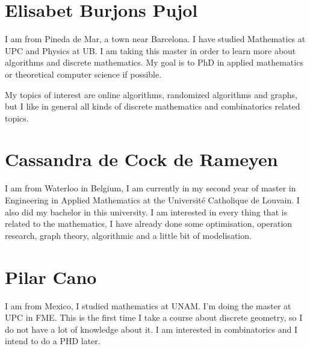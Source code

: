\documentclass[11pt]{amsart}
\begin{document}
\section*{Elisabet Burjons Pujol}

I am from Pineda de Mar, a town near Barcelona. I have studied Mathematics at UPC and Physics at UB. 
I am taking this master in order to learn more about algorithms and discrete mathematics.
My goal is to PhD in applied mathematics or theoretical computer science if possible.

My topics of interest are online algorithms, randomized algorithms and graphs,
but I like in general all kinds of discrete mathematics and combinatorics related topics.

\section*{Cassandra de Cock de Rameyen}
I am from Waterloo in Belgium, I am currently in my second year of master in Engineering in Applied Mathematics at the Université Catholique de Louvain. I also did my bachelor in this university. I am interested in every thing that is related to the mathematics, I have already done some optimisation, operation research, graph theory, algorithmic and a little bit of modelisation.


\section*{Pilar Cano}
I am from Mexico, I studied mathematics at UNAM. I'm doing the master at UPC in FME. 
This is the first time I take a course about discrete geometry, so I do not have a lot of knowledge about it. 
I am interested in combinatorics and I intend to do a PHD later.
\end{document}

